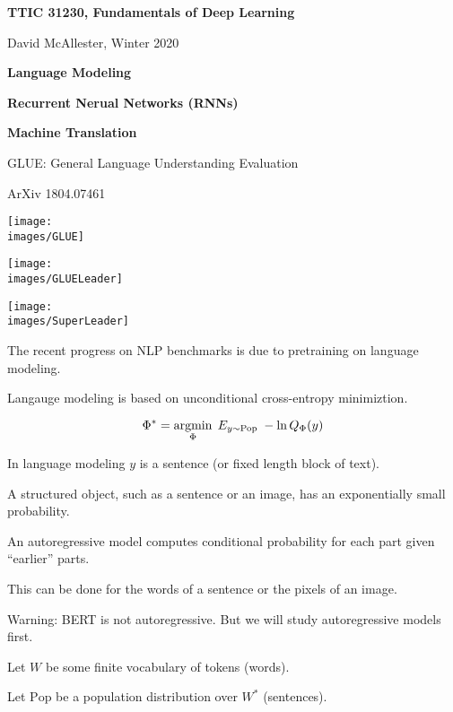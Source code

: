 




{\Huge

  \centerline{\bf TTIC 31230, Fundamentals of Deep Learning}
  \bigskip
  \centerline{David McAllester, Winter 2020}
  \vfill
  \centerline{\bf Language Modeling}
  \vfill
  \centerline{\bf Recurrent Nerual Networks (RNNs)}
  \vfill
  \centerline{\bf Machine Translation}


GLUE: General Language Understanding Evaluation

\vfill

\centerline{\normalsize ArXiv 1804.07461}
\centerline{\texttt{[image: \\images/GLUE]}}


\centerline{\texttt{[image: \\images/GLUELeader]}}


\centerline{\texttt{[image: \\images/SuperLeader]}}


The recent progress on NLP benchmarks is due to pretraining on language modeling.

\vfill
Langauge modeling is based on unconditional cross-entropy minimiztion.

\vfill
$$\Phi^* = \operatorname*{argmin}_\Phi \;E_{y \sim \mathrm{Pop}}\;-\ln Q_\Phi(y)$$

\vfill
In language modeling $y$ is a sentence (or fixed length block of text).


A structured object, such as a sentence or an image, has an exponentially small probability.

\vfill
An autoregressive model computes conditional probability for each part given ``earlier'' parts.

\vfill
This can be done for the words of a sentence or the pixels of an image.

\vfill
Warning: BERT is not autoregressive.  But we will study autoregressive models first.


Let $W$ be some finite vocabulary of tokens (words).

\vfill
Let $\mathrm{Pop}$ be a population distribution over $W^*$ (sentences).

}
